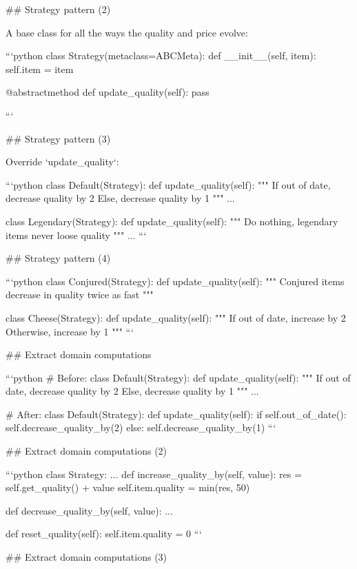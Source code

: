 {## Strategy pattern (2)

A base class for all the ways the quality and
price evolve:

```python
class Strategy(metaclass=ABCMeta):
    def __init__(self, item):
        self.item = item

    @abstractmethod
    def update_quality(self):
        pass

```


## Strategy pattern (3)

Override `update_quality`:


```python
class Default(Strategy):
    def update_quality(self):
        """
        If out of date, decrease quality by 2
        Else, decrease quality by 1
        """
        ...

class Legendary(Strategy):
    def update_quality(self):
        """
        Do nothing, legendary items never loose
        quality
        """
        ...
```

## Strategy pattern (4)



```python
class Conjured(Strategy):
    def update_quality(self):
        """
        Conjured items decrease in quality twice
        as fast
        """


class Cheese(Strategy):
    def update_quality(self):
        """
        If out of date, increase by 2
        Otherwise, increase by 1
        """
```

## Extract domain computations

```python
# Before:
class Default(Strategy):
    def update_quality(self):
        """
        If out of date, decrease quality by 2
        Else, decrease quality by 1
        """
        ...

# After:
class Default(Strategy):
    def update_quality(self):
        if self.out_of_date():
            self.decrease_quality_by(2)
        else:
            self.decrease_quality_by(1)
```

## Extract domain computations (2)

```python
class Strategy:
    ...
    def increase_quality_by(self, value):
        res = self.get_quality() + value
        self.item.quality = min(res, 50)

    def decrease_quality_by(self, value):
        ...

    def reset_quality(self):
        self.item.quality = 0
```

## Extract domain computations (3)

}

